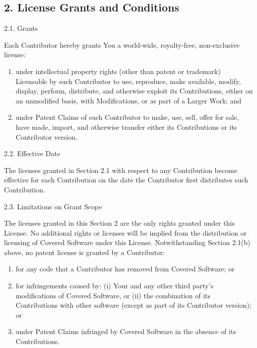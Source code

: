 \documentclass[letterpaper,10pt,openany,oneside,english]{sphinxmanual}
\begin{document}
\subsection{2. License Grants and Conditions}
\label{\detokenize{warranty:license-grants-and-conditions}}
2.1. Grants

Each Contributor hereby grants You a world-wide, royalty-free,
non-exclusive license:
\begin{enumerate}
\item {} 
under intellectual property rights (other than patent or trademark)
Licensable by such Contributor to use, reproduce, make available,
modify, display, perform, distribute, and otherwise exploit its
Contributions, either on an unmodified basis, with Modifications, or
as part of a Larger Work; and

\item {} 
under Patent Claims of such Contributor to make, use, sell, offer
for sale, have made, import, and otherwise transfer either its
Contributions or its Contributor version.

\end{enumerate}

2.2. Effective Date

The licenses granted in Section 2.1 with respect to any Contribution
become effective for each Contribution on the date the Contributor first
distributes such Contribution.

2.3. Limitations on Grant Scope

The licenses granted in this Section 2 are the only rights granted under
this License. No additional rights or licenses will be implied from the
distribution or licensing of Covered Software under this License.
Notwithstanding Section 2.1(b) above, no patent license is granted by a
Contributor:
\begin{enumerate}
\item {} 
for any code that a Contributor has removed from Covered Software;
or

\item {} 
for infringements caused by: (i) Your and any other third party’s
modifications of Covered Software, or (ii) the combination of its
Contributions with other software (except as part of its Contributor
version); or

\item {} 
under Patent Claims infringed by Covered Software in the absence of
its Contributions.

\end{enumerate}
\end{document}
